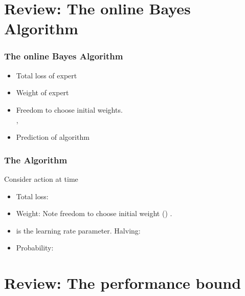 \documentclass{beamer}
\begin{document}
\section{Review: The online Bayes Algorithm}

\begin{frame}
\frametitle{The online Bayes Algorithm}
\begin{itemize}
\item {\color{blue} Total loss} of expert 
\item {\color{blue}Weight} of expert 
\item
Freedom to choose initial weights.\\
 , 
\item {\color{blue}Prediction} of algorithm 
\R{\[
\vp_A^t = \frac{\sum_{i=1}^N \wt{t}{i} \vp_i^t}{\sum_{i=1}^N \wt{t}{i}}
\]}
\end{itemize}
\end{frame}


\begin{frame}
\frametitle{The \ouralg Algorithm}
Consider action  at time 
\begin{itemize}
\item Total loss:
\item Weight:
Note freedom to choose initial weight ()
.
\item
{} is the learning rate parameter. Halving: \R{$\eta \to \infty$}
\item Probability:
\end{itemize}
\end{frame}

\section{Review: The performance bound}
\end{document}
